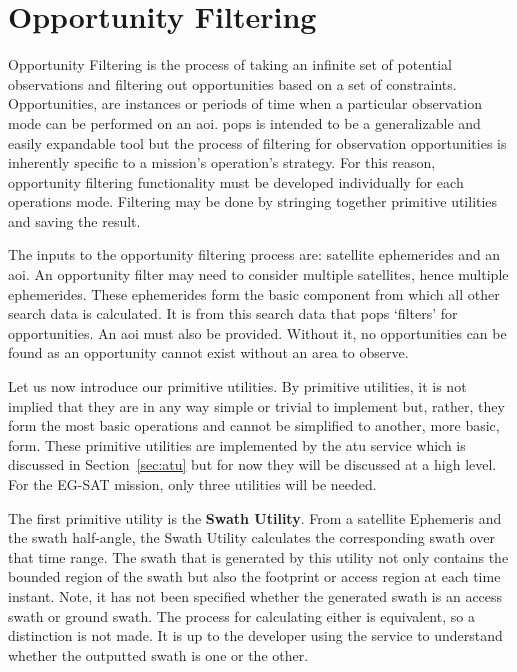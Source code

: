 \section{Opportunity Filtering} \label{sec:opp-filtering}

Opportunity Filtering is the process of taking an infinite set of potential
observations and filtering out opportunities based on a set of constraints.
Opportunities, are instances or periods of time when a particular observation
mode can be performed on an \gls{aoi}. \gls{pops} is intended to be a
generalizable and easily expandable tool but the process of filtering for
observation opportunities is inherently specific to a mission’s operation’s
strategy.  For this reason, opportunity filtering functionality must be
developed individually for each operations mode.  Filtering may be done by
stringing together primitive utilities and saving the result. 

The inputs to the opportunity filtering process are: satellite ephemerides and
an \gls{aoi}. An opportunity filter may need to consider multiple satellites,
hence multiple ephemerides. These ephemerides form the basic component from
which all other search data is calculated. It is from this search data that
\gls{pops} `filters' for opportunities. An \gls{aoi} must also be provided.
Without it, no opportunities can be found as an opportunity cannot exist
without an area to observe.

Let us now introduce our primitive utilities. By primitive utilities, it is not
implied that they are in any way simple or trivial to implement but, rather,
they form the most basic operations and cannot be simplified to another, more
basic, form.  These primitive utilities are implemented by the \gls{atu}
service which is discussed in Section~\ref{sec:atu} but for now they will be
discussed at a high level. For the EG-SAT mission, only three utilities will be
needed.

The first primitive utility is the \textbf{Swath Utility}. From a satellite
Ephemeris and the swath half-angle, the Swath Utility calculates the
corresponding swath over that time range. The swath that is generated by this
utility not only contains the bounded region of the swath but also the
footprint or access region at each time instant. Note, it has not been
specified whether the generated swath is an access swath or ground swath.  The
process for calculating either is equivalent, so a distinction is not made.  It
is up to the developer using the service to understand whether the outputted
swath is one or the other.


